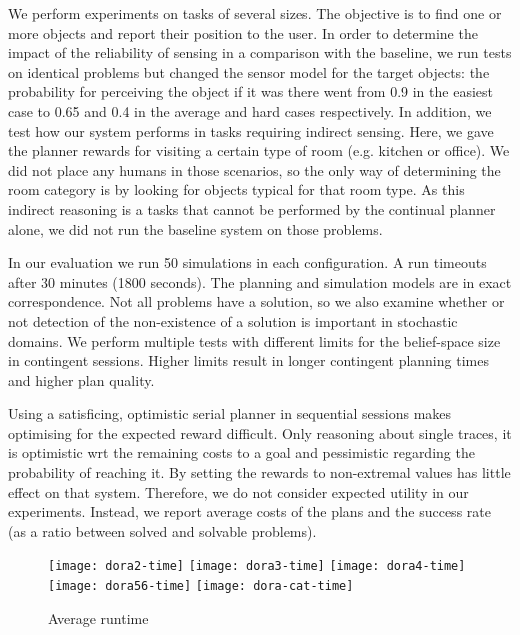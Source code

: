 
We perform experiments on tasks of several sizes. The objective is to
find one or more objects and report their position to the user. In
order to determine the impact of the reliability of sensing in a
comparison with the baseline, we run tests on identical problems but
changed the sensor model for the target objects: the probability for
perceiving the object if it was there went from 0.9 in the easiest
case to 0.65 and 0.4 in the average and hard cases respectively. In
addition, we test how our system performs in tasks requiring indirect
sensing. Here, we gave the planner rewards for visiting a certain type
of room (e.g. kitchen or office). We did not place any humans in those
scenarios, so the only way of determining the room category is by
looking for objects typical for that room type. As this indirect
reasoning is a tasks that cannot be performed by the continual planner
alone, we did not run the baseline system on those problems.



In our evaluation we run 50 simulations in each configuration. A run
timeouts after 30 minutes (1800 seconds). The planning and simulation
models are in exact correspondence. Not all problems have a solution,
so we also examine whether or not detection of the non-existence of a
solution is important in stochastic domains.
We perform multiple tests with different limits for the
belief-space size in contingent sessions.  Higher limits result in
longer contingent planning times and higher plan quality.


Using a satisficing, optimistic serial planner in sequential sessions
makes optimising for the expected reward difficult. Only reasoning
about single traces, it is optimistic wrt the remaining costs to a
goal and pessimistic regarding the probability of reaching it. By
setting the rewards to non-extremal values has little effect on that
system. Therefore, we do not consider expected utility in our
experiments. Instead, we report average costs of the plans and the
success rate (as a ratio between solved and solvable problems).

\begin{figure}[h!]
  \texttt{[image: dora2-time]}\hfill
  \vspace{2mm}
  \texttt{[image: dora3-time]}\hfill
  \vspace{2mm}
  \texttt{[image: dora4-time]}\hfill
  \vspace{2mm}
  \texttt{[image: dora56-time]}\hfill
  \vspace{2mm}
  \texttt{[image: dora-cat-time]}\hfill
  \caption{Average runtime}
  \label{fig:results-time}
\end{figure}

